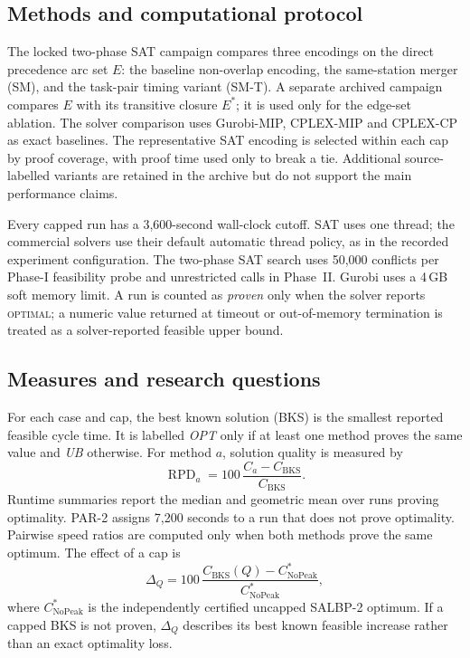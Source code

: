 \subsection{Methods and computational protocol}

The locked two-phase SAT campaign compares three encodings on the direct
precedence arc set \(E\): the baseline non-overlap encoding, the same-station
merger (SM), and the task-pair timing variant (SM-T). A separate archived
campaign compares \(E\) with its transitive closure \(E^*\); it is used only
for the edge-set ablation. The solver comparison uses Gurobi-MIP, CPLEX-MIP
and CPLEX-CP as exact baselines. The representative SAT encoding is selected
within each cap by proof coverage, with proof time used only to break a tie.
Additional source-labelled variants are retained in the archive but do not
support the main performance claims.

Every capped run has a 3,600-second wall-clock cutoff. SAT uses one thread;
the commercial solvers use their default automatic thread policy, as in the
recorded experiment configuration. The two-phase SAT search uses 50,000
conflicts per Phase-I feasibility probe and unrestricted calls in Phase~II.
Gurobi uses a 4\,GB soft memory limit. A run is counted as \emph{proven} only
when the solver reports \textsc{optimal}; a numeric value returned at timeout
or out-of-memory termination is treated as a solver-reported feasible upper
bound.

\subsection{Measures and research questions}

For each case and cap, the best known solution (BKS) is the smallest reported
feasible cycle time. It is labelled \emph{OPT} only if at least one method
proves the same value and \emph{UB} otherwise. For method \(a\), solution
quality is measured by
\[
  \operatorname{RPD}_a =
  100\,\frac{C_a-C_{\mathrm{BKS}}}{C_{\mathrm{BKS}}}.
\]
Runtime summaries report the median and geometric mean over runs proving
optimality. PAR-2 assigns 7,200 seconds to a run that does not prove
optimality. Pairwise speed ratios are computed only when both methods prove
the same optimum. The effect of a cap is
\[
  \Delta_Q =
  100\,\frac{C_{\mathrm{BKS}}(Q)-C^*_{\mathrm{NoPeak}}}
  {C^*_{\mathrm{NoPeak}}},
\]
where \(C^*_{\mathrm{NoPeak}}\) is the independently certified uncapped
SALBP-2 optimum. If a capped BKS is not proven, \(\Delta_Q\) describes its
best known feasible increase rather than an exact optimality loss.

